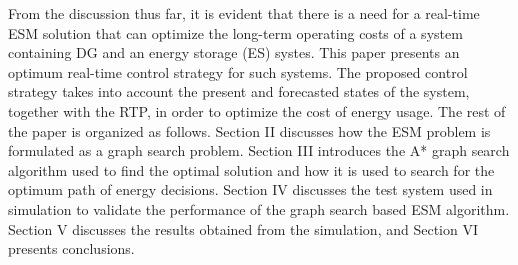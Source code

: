 From the discussion thus far, it is evident that there is a need for a real-time ESM solution that can optimize the long-term operating costs of a system containing DG and an energy storage (ES) systes. This paper presents an optimum real-time control strategy for such systems. The proposed control strategy takes into account the present and forecasted states of the system, together with the RTP, in order to optimize the cost of energy usage. The rest of the paper is organized as follows. Section II discusses how the ESM problem is formulated as a graph search problem. Section III introduces the A* graph search algorithm used to find the optimal solution and how it is used to search for the optimum path of energy decisions. Section IV discusses the test system used in simulation to validate the performance of the graph search based ESM algorithm. Section V discusses the results obtained from the simulation, and Section VI presents conclusions.